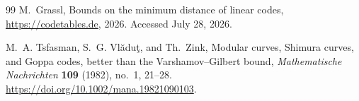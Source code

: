 \documentclass[12pt]{article}
\begin{document}
\begin{thebibliography}{99}
M.~Grassl,
\newblock Bounds on the minimum distance of linear codes,
\newblock \url{https://codetables.de}, 2026.
\newblock Accessed July 28, 2026.

M.~A. Tsfasman, S.~G. Vl\u{a}du\c{t}, and Th.~Zink,
\newblock Modular curves, Shimura curves, and Goppa codes, better than the Varshamov--Gilbert bound,
\newblock \emph{Mathematische Nachrichten} \textbf{109} (1982), no.~1, 21--28.
\newblock \url{https://doi.org/10.1002/mana.19821090103}.

\end{thebibliography}




\newpage
\end{document}
